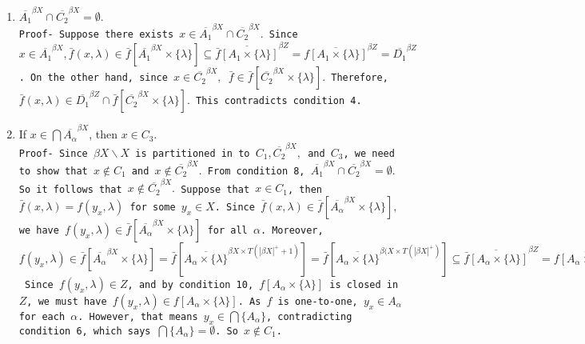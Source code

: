 \documentclass{article}
\begin{document}
\begin{enumerate}
\vskip 20pt

	
	\item $\overline{A_1}^{\beta X} \cap \overline{C_2}^{\beta X}=\emptyset.$ \\
	\texttt{Proof- Suppose there exists $x\in \overline{A_1}^{\beta X}\cap \overline{C_2}^{\beta X}.$ Since $x\in \overline{A_1}^{\beta X}, \bar{f}(x,\lambda)\in \bar{f}\left[\overline{A_1}^{\beta X}\times \{\lambda\}\right] \subseteq \overline{\bar{f}\left[A_1\times\{\lambda\}\right]}^{\beta Z}=\overline{f\left[A_1\times\{\lambda\}\right]}^{\beta Z}=\overline{D_1}^{\beta Z}$. On the other hand, since $x\in \overline{C_2}^{\beta X},$ $\bar{f}\in \bar{f}\left[\overline{C_2}^{\beta X}\times \{\lambda\}\right].$ Therefore, $\bar{f}(x,\lambda)\in \overline{D_1}^{\beta Z} \cap \bar{f}\left[\overline{C_2}^{\beta X}\times \{\lambda\}\right].$ This contradicts condition 4.
	}

\vskip 20pt
	
	\item If $x\in \bigcap \overline{A_\alpha}^{\beta X}$, then $x\in C_3.$\\
	\texttt{Proof- Since $\beta X\backslash X$ is partitioned in to $C_1, \overline{C_2}^{\beta X},$ and $C_3$, we need to show that $x\notin C_1$ and $x\notin \overline{C_2}^{\beta X}.$ From condition 8, $\overline{A_1}^{\beta X} \cap \overline{C_2}^{\beta X}=\emptyset.$ So it follows that $x\notin \overline{C_2}^{\beta X}.$  Suppose that $x\in C_1$, then $\bar{f}(x,\lambda)=f(y_x,\lambda)$ for some $y_x\in X$. Since $\bar{f}(x,\lambda) \in \bar{f}\left[\overline{A_\alpha}^{\beta X} \times \{\lambda\}\right], $ we have $f(y_x,\lambda)\in \bar{f}\left[\overline{A_\alpha}^{\beta X}\times \{\lambda\}\right]$ for all $\alpha$. Moreover, $f(y_x,\lambda)\in \bar{f}\left[\overline{A_\alpha}^{\beta X}\times \{\lambda\}\right]=\bar{f}\left[\overline{A_\alpha \times \{\lambda\}}^{\beta X\times T(|\beta X|^+ +1)}\right]=\bar{f}\left[\overline{A_\alpha \times \{\lambda\}}^{\beta (X\times T(|\beta X|^+ )}\right]\subseteq \overline{\bar{f}\left[A_\alpha \times \{\lambda\}\right]}^{\beta Z}=\overline{f\left[A_\alpha \times \{\lambda\}\right]}^{\beta Z}.$	              
	Since $f(y_x,\lambda)\in Z$, and by condition 10, $f\left[A_\alpha\times\{\lambda\}\right]$ is closed in $Z$, we must have $f(y_x,\lambda)\in f\left[A_\alpha\times\{\lambda\}\right]$. As $f$ is one-to-one, $y_x\in A_\alpha$ for each $\alpha$. However, that means $y_x\in \bigcap \{A_\alpha\}$, contradicting condition 6, which says $\bigcap \{A_\alpha\}=\emptyset$. So $x\notin C_1$. }



\end{enumerate}
\end{document}
